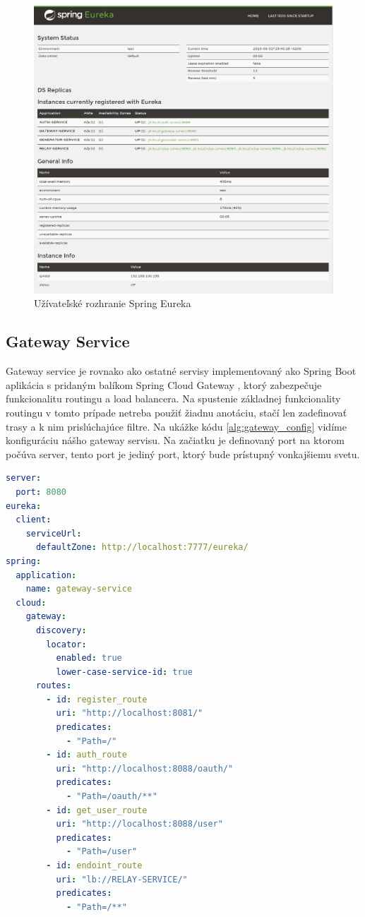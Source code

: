 \begin{figure}[!htbp]
	\centering
	\includegraphics[width=16cm]{img/eureka_gui.png}
	\caption{Užívateľské rozhranie Spring Eureka}
	\label{eureka_gui}
\end{figure}

\subsection{Gateway Service}
Gateway service je rovnako ako ostatné servisy implementovaný ako Spring Boot aplikácia s pridaným balíkom Spring Cloud Gateway \cite{cloud_gateway}, ktorý zabezpečuje funkcionalitu routingu a load balancera.
Na spustenie základnej funkcionality routingu v tomto prípade netreba použiť žiadnu anotáciu, stačí len zadefinovať trasy a k nim prislúchajúce filtre. Na ukážke kódu \ref{alg:gateway_config} vidíme konfiguráciu nášho gateway servisu. Na začiatku je definovaný port na ktorom počúva server, tento port je jediný port, ktorý bude prístupný vonkajšiemu svetu.

\begin{lstlisting}[float, caption={Konfigurácia Gateway servisu},label={alg:gateway_config},language=yaml]
server:
  port: 8080
eureka:
  client:
    serviceUrl:
      defaultZone: http://localhost:7777/eureka/
spring:
  application:
    name: gateway-service
  cloud:
    gateway:
      discovery:
        locator:
          enabled: true
          lower-case-service-id: true
      routes:
        - id: register_route
          uri: "http://localhost:8081/"
          predicates:
            - "Path=/"
        - id: auth_route
          uri: "http://localhost:8088/oauth/"
          predicates:
            - "Path=/oauth/**"
        - id: get_user_route
          uri: "http://localhost:8088/user"
          predicates:
            - "Path=/user"
        - id: endoint_route
          uri: "lb://RELAY-SERVICE/"
          predicates:
            - "Path=/**"
\end{lstlisting}

